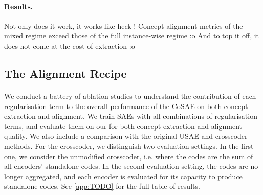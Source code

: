 \documentclass{article}
\begin{document}
\paragraph{Results.} Not only does it work, it works like heck ! Concept alignment metrics of the mixed regime exceed those of the full instance-wise regime :o And to top it off, it does not come at the cost of extraction :o

\begin{table}[h]
  \centering
  \caption{\textbf{A small number of pairs is enough to anchor distributional regularisation for instance-wise alignment.} SAE quality on \textbf{vision embeddings} under different regularisation regimes.}
  \label{tab:anchoring}
\end{table}

\subsection{The Alignment Recipe}

\paragraph{} We conduct a battery of ablation studies to understand the contribution of each regularisation term to the overall performance of the CoSAE on both concept extraction and alignment. We train SAEs with all combinations of regularisation terms, and evaluate them on our \InterVenchA for both concept extraction and alignment quality. We also include a comparison with the original USAE and crosscoder methods. For the crosscoder, we distinguish two evaluation settings. In the first one, we consider the unmodified crosscoder, i.e. where the codes are the sum of all encoders' standalone codes. In the second evaluation setting, the codes are no longer aggregated, and each encoder is evaluated for its capacity to produce standalone codes.
See \cref{app:TODO} for the full table of results.
\end{document}
